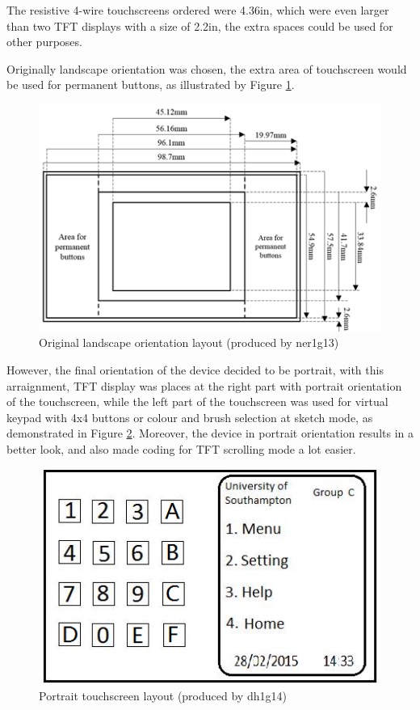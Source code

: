 \documentclass[a4paper,notitlepage,10pt]{report}
\begin{document}
\begin{multicols}{2}
The resistive 4-wire touchscreens ordered were 4.36in, which were even larger than two TFT displays with a size of 2.2in, the extra spaces could be used for other purposes.
\vspace{6pt}

Originally landscape orientation was chosen, the extra area of touchscreen would be used for permanent buttons, as illustrated by Figure \ref{fig:tsLandscape}.
\vspace{6pt}

\begin{figure}[H]
	\centering
	\includegraphics[width=0.75\columnwidth]{ts_landscape}
	\caption{Original landscape orientation layout (produced by ner1g13)}
	\label{fig:tsLandscape}
\end{figure}
\vspace{6pt}

However, the final orientation of the device decided to be portrait, with this arraignment, TFT display was places at the right part with portrait orientation of the touchscreen, while the left part of the touchscreen was used for virtual keypad with 4x4 buttons or colour and brush selection at sketch mode, as demonstrated in Figure \ref{fig:tsLayout}. Moreover, the device in portrait orientation results in a better look, and also made coding for TFT scrolling mode a lot easier.
\vspace{6pt}

\begin{figure}[H]
	\centering
	\includegraphics[width=0.6\columnwidth]{ts_layout}
	\caption{Portrait touchscreen layout (produced by dh1g14)}
	\label{fig:tsLayout}
\end{figure}
\vspace{6pt}


\end{multicols}
\end{document}
